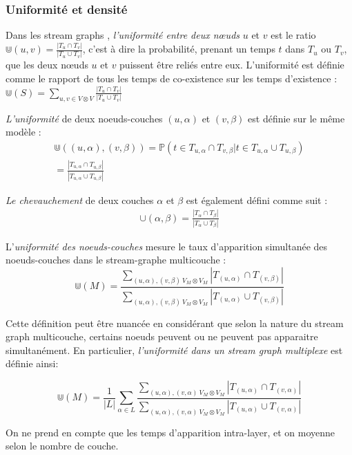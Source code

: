 \documentclass[11pt,a4paper]{article}
\theoremstyle{definition}
\theoremstyle{remark}
\theoremstyle{remark}
\begin{document}
	


	\subsubsection{Uniformité et densité}
	
	Dans les stream graphs \cite{stream}, {\em l'uniformité entre deux nœuds} $u$ et $v$ est le ratio $\Cup (u,v) = \frac{|T_u\cap T_v|}{|T_u \cup T_v|}$, c'est à dire la probabilité, prenant un temps $t$ dans $T_u$ ou $T_v$, que les deux nœuds $u$ et $v$ puissent être reliés entre eux. L'uniformité est définie comme le rapport de tous les temps de co-existence sur les temps d'existence : $
 \Cup(S)=\sum_{u,v \in V \otimes V}\frac{|T_u\cap T_v|}{|T_u\cup T_v|}
$
	
		
	{\em L'uniformité } de deux noeuds-couches $(u,\alpha)$ et $(v,\beta)$ est définie sur le même modèle :
	\begin{align*}
		\Cup((u,\alpha),(v,\beta))=\mathbb{P}( t \in T_{u,\alpha} \cap T_{v,\beta} | t \in T_{u,\alpha} \cup T_{u,\beta}) \\
		= \frac{|T_{u,\alpha}\cap T_{u,\beta}|}{|T_{u,\alpha}\cup T_{u,\beta}|}
	\end{align*}

	{\em Le chevauchement} de deux couches $\alpha$ et $\beta$ est également défini comme suit :
	\begin{align*}
		\cup(\alpha,\beta) = \frac{|T_{\alpha}\cap T_{\beta}|}{|T_{\alpha}\cup T_{\beta}|}
	\end{align*}

    L'{\em uniformité des noeuds-couches} mesure le taux d'apparition simultanée des noeuds-couches dans le stream-graphe multicouche :
    \[
    	\Cup(M) = \frac{\sum_{(u,\alpha),(v,\beta) \ V_M \otimes V_M}{|T_{(u,\alpha)} \cap T_{(v,\beta)}|}}{\sum_{(u,\alpha),(v,\beta) \ V_M \otimes V_M}{|T_{(u,\alpha)}\cup T_{(v,\beta)}|}}
    \]
	
	Cette définition peut être nuancée en considérant que selon la nature du stream graph multicouche, certains noeuds peuvent ou ne peuvent pas apparaitre simultanément. En particulier, {\em l'uniformité dans un stream graph multiplexe} est définie ainsi:	
	
	\[
    	\Cup(M) = \frac{1}{|L|}\sum_{\alpha \in L} \frac{\sum_{(u,\alpha),(v,\alpha) \ V_M \otimes V_M}{|T_{(u,\alpha)} \cap T_{(v,\alpha)}|}}{\sum_{(u,\alpha),(v,\alpha) \ V_M \otimes V_M}{|T_{(u,\alpha)}\cup T_{(v,\alpha)}|}}
    \]
    
    On ne prend en compte que les temps d'apparition intra-layer, et on moyenne selon le nombre de couche. 
\end{document}
